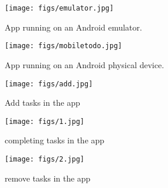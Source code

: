 \documentclass{article}
\begin{document}
\begin{figure}[ht!]
    \centering
    \texttt{[image: figs/emulator.jpg]} %
    \caption{App running on an Android emulator.}
    \label{fig:emulator-screenshot}
\end{figure}



\begin{figure}[ht!]
    \centering
    \texttt{[image: figs/mobiletodo.jpg]} %
    \caption{App running on an Android physical device.}
    \label{fig:mobile-screenshot}
\end{figure}

\begin{figure}[ht!]
    \centering
    \texttt{[image: figs/add.jpg]} %
    \caption{Add tasks in the app}
    \label{fig:mobile-screenshot-add}
\end{figure}

\begin{figure}[ht!]
    \centering
    \texttt{[image: figs/1.jpg]} %
    \caption{completing tasks in the app}
    \label{fig:mobile-screenshot-complete}
\end{figure}

\begin{figure}[ht!]
    \centering
    \texttt{[image: figs/2.jpg]} %
    \caption{remove tasks in the app}
    \label{fig:mobile-screenshot-remove}
\end{figure}
\end{document}
